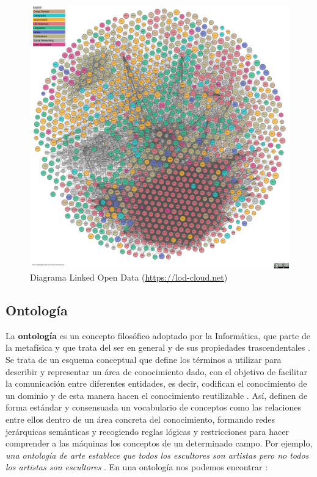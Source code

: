 \begin{figure}[H]
	\centering
	\includegraphics[width=0.9\linewidth]{imagenes/capitulo3/lod-cloud-sm}
	\caption{Diagrama Linked Open Data (\url{https://lod-cloud.net})}
	\label{fig:lod-cloud-sm}
\end{figure}





\subsection{Ontología} %

La \textbf{ontología} es un concepto filosófico adoptado por la Informática, que parte de la metafísica y que trata del ser en general y de sus propiedades trascendentales \cite{apuntes-clase-jose}. Se trata de un esquema conceptual que define los términos a utilizar para describir y representar un área de conocimiento dado, con el objetivo de facilitar la comunicación entre diferentes entidades, es decir, codifican el conocimiento de un dominio y de esta manera hacen el conocimiento reutilizable \cite{tesis}. Así, definen de forma estándar y consensuada un vocabulario de conceptos como las relaciones entre ellos dentro de un área concreta del conocimiento, formando redes jerárquicas semánticas y recogiendo reglas lógicas y restricciones para hacer comprender a las máquinas los conceptos de un determinado campo. Por ejemplo, \textit{una ontología de arte establece que todos los escultores son artistas pero no todos los artistas son escultores} \cite{web-semantica-w3c}. En una ontología nos podemos encontrar \cite{aplicacion, apuntes-clase-jose}:

